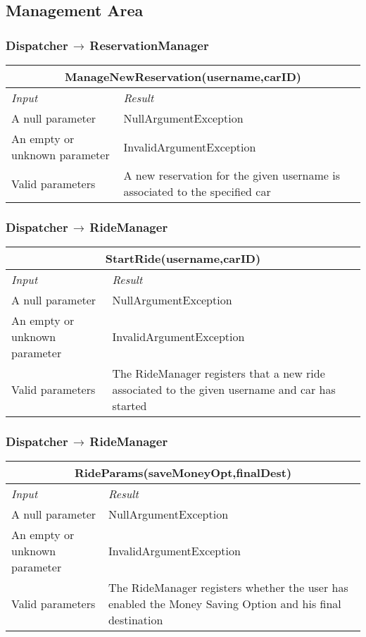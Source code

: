 \documentclass[11pt,a4paper]{report}
\begin{document}
\subsection{Management Area}
\subsubsection{Dispatcher$\,\to\,$ReservationManager}
\begin{tabularx}{\textwidth}{|X|X|}
	\hline
	\multicolumn{2}{|c|}{\textbf{ManageNewReservation(username,carID)}}\\
	\hline
	\textit{Input} & \textit{Result}\\
	\hline
	A null parameter & NullArgumentException\\
	\hline
	An empty or unknown parameter & InvalidArgumentException\\
	\hline
	Valid parameters & A new reservation for the given username is associated to the specified car\\
	\hline
\end{tabularx}
\subsubsection{Dispatcher$\,\to\,$RideManager}
\begin{tabularx}{\textwidth}{|X|X|}
	\hline
	\multicolumn{2}{|c|}{\textbf{StartRide(username,carID)}}\\
	\hline
	\textit{Input} & \textit{Result}\\
	\hline
	A null parameter & NullArgumentException\\
	\hline
	An empty or unknown parameter & InvalidArgumentException\\
	\hline
	Valid parameters & The RideManager registers that a new ride associated to the given username and car has started\\
	\hline
\end{tabularx}
\subsubsection{Dispatcher$\,\to\,$RideManager}
\begin{tabularx}{\textwidth}{|X|X|}
	\hline
	\multicolumn{2}{|c|}{\textbf{RideParams(saveMoneyOpt,finalDest)}}\\
	\hline
	\textit{Input} & \textit{Result}\\
	\hline
	A null parameter & NullArgumentException\\
	\hline
	An empty or unknown parameter & InvalidArgumentException\\
	\hline
	Valid parameters & The RideManager registers whether the user has enabled the Money Saving Option and his final destination\\
	\hline
\end{tabularx}
\end{document}
